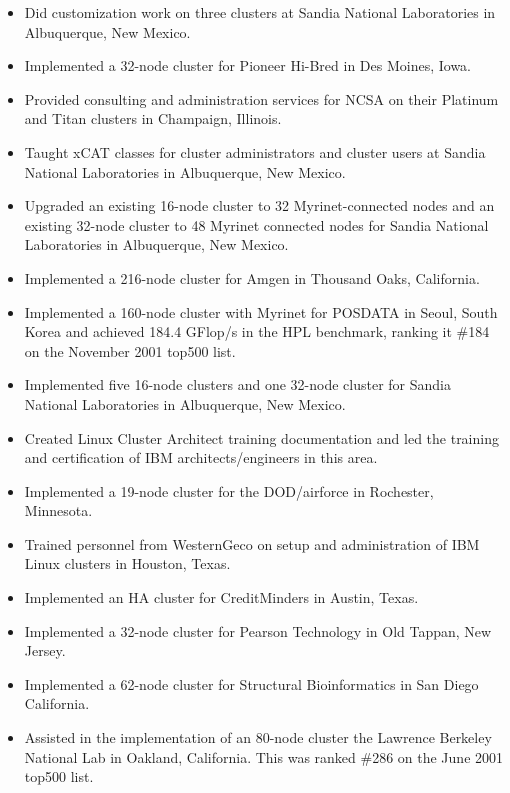 \documentclass[letterpaper,10pt]{article}
\newcommand{\resitem}[1]{\item #1 \vspace{-2pt}}
\begin{document}
\begin{itemize}
\begin{itemize}
        \resitem{Did customization work on three clusters at Sandia National Laboratories in Albuquerque, New Mexico.}
        \resitem{Implemented a 32-node cluster for Pioneer Hi-Bred in Des Moines, Iowa.}
        \resitem{Provided consulting and administration services for NCSA on their Platinum and Titan clusters in Champaign, Illinois.}
        \resitem{Taught xCAT classes for cluster administrators and cluster users at Sandia National Laboratories in Albuquerque, New Mexico.}
        \resitem{Upgraded an existing 16-node cluster to 32 Myrinet-connected nodes and an existing 32-node cluster to 48 Myrinet connected nodes for Sandia National Laboratories in Albuquerque, New Mexico.}
        \resitem{Implemented a 216-node cluster for Amgen in Thousand Oaks, California.}
        \resitem{Implemented a 160-node cluster with Myrinet for POSDATA in Seoul, South Korea and achieved 184.4 GFlop/s in the HPL benchmark, ranking it \#184 on the November 2001 top500 list.}
        \resitem{Implemented five 16-node clusters and one 32-node cluster for Sandia National Laboratories in Albuquerque, New Mexico.}
        \resitem{Created Linux Cluster Architect training documentation and led the training and certification of IBM architects/engineers in this area.}
        \resitem{Implemented a 19-node cluster for the DOD/airforce in Rochester, Minnesota.}
        \resitem{Trained personnel from WesternGeco on setup and administration of IBM Linux clusters in Houston, Texas.}
        \resitem{Implemented an HA cluster for CreditMinders in Austin, Texas.}
        \resitem{Implemented a 32-node cluster for Pearson Technology in Old Tappan, New Jersey.}
        \resitem{Implemented a 62-node cluster for Structural Bioinformatics in San Diego California.}
        \resitem{Assisted in the implementation of an 80-node cluster the Lawrence Berkeley National Lab in Oakland, California. This was ranked \#286 on the June 2001 top500 list.}
    \end{itemize}


\end{itemize}
\end{document}
